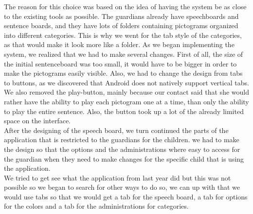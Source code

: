 The reason for this choice was based on the idea of having the system be as close to the existing tools as possible. The guardians already have speechboards and sentence boards, and they have lots of folders containing pictograms organized into different categories. This is why we went for the tab style of the categories, as that would make it look more like a folder.\newline
As we began implementing the system, we realized that we had to make several changes. First of all, the size of the initial sentenceboard was too small, it would have to be bigger in order to make the pictograms easily visible. Also, we had to change the design from tabs to buttons, as we discovered that Android does not natively support vertical tabs. We also removed the play-button, mainly because our contact said that she would rather have the ability to play each pictogram one at a time, than only the ability to play the entire sentence. Also, the button took up a lot of the already limited space on the interface.\newline
\\
After the designing of the speech board, we turn continued the parts of the application that is restricted to the guardians for the children. we had to make the design so that the options and the administrations where easy to access for the guardian when they need to make changes for the specific child that is using the application. 
\\
We tried to get see what the application from last year did but this was not possible so we began to search for other ways to do so, we can up with that we would use tabs so that we would get a tab for the speech board, a tab for options for the colors and a tab for the administrations for categories.\\

